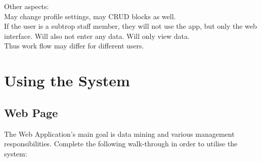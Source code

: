 \documentclass[11pt,a4paper,titlepage]{article}
\begin{document}
Other aspects:\\
May change profile settings, may CRUD blocks as well.\\

If the user is a subtrop staff member, they will not use the app, but only the web interface. Will also not enter any data. Will only view data.\\

Thus work flow may differ for different users.



\section{Using the System}
\subsection{Web Page}
		 The Web Application's main goal is data mining and various management responsibilities. Complete the following walk-through in order to utilise the system:
\end{document}
